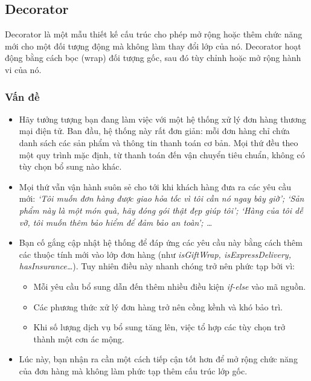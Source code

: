 \thispagestyle{empty}
\subsection{Decorator}
\begin{flushleft}
    Decorator là một mẫu thiết kế cấu trúc cho phép mở rộng hoặc thêm chức năng mới cho một đối tượng động mà không làm thay đổi lớp của nó. Decorator hoạt động bằng cách bọc (wrap) đối tượng gốc, sau đó tùy chỉnh hoặc mở rộng hành vi của nó.
\end{flushleft}

\subsubsection{Vấn đề}
\begin{itemize}
    \item Hãy tưởng tượng bạn đang làm việc với một hệ thống xử lý đơn hàng thương mại điện tử. Ban đầu, hệ thống này rất đơn giản: mỗi đơn hàng chỉ chứa danh sách các sản phẩm và thông tin thanh toán cơ bản. Mọi thứ đều theo một quy trình mặc định, từ thanh toán đến vận chuyển tiêu chuẩn, không có tùy chọn bổ sung nào khác.
    \item Mọi thứ vẫn vận hành suôn sẻ cho tới khi khách hàng đưa ra các yêu cầu mới: \textit{`Tôi muốn đơn hàng được giao hỏa tốc vì tôi cần nó ngay bây giờ'; `Sản phẩm này là một món quà, hãy đóng gói thật đẹp giúp tôi'; `Hàng của tôi dễ vỡ, tôi muốn thêm bảo hiểm để đảm bảo an toàn'; \ldots}
    \item Bạn cố gắng cập nhật hệ thống để đáp ứng các yêu cầu này bằng cách thêm các thuộc tính mới vào lớp đơn hàng (như \textit{isGiftWrap, isExpressDelivery, hasInsurance\ldots}). Tuy nhiên điều này nhanh chóng trở nên phức tạp bởi vì:
          \begin{itemize}
              \item Mỗi yêu cầu bổ sung dẫn đến thêm nhiều điều kiện \textit{if-else} vào mã nguồn.
              \item Các phương thức xử lý đơn hàng trở nên cồng kềnh và khó bảo trì.
              \item Khi số lượng dịch vụ bổ sung tăng lên, việc tổ hợp các tùy chọn trở thành một cơn ác mộng.
          \end{itemize}
    \item Lúc này, bạn nhận ra cần một cách tiếp cận tốt hơn để mở rộng chức năng của đơn hàng mà không làm phức tạp thêm cấu trúc lớp gốc.
\end{itemize}

